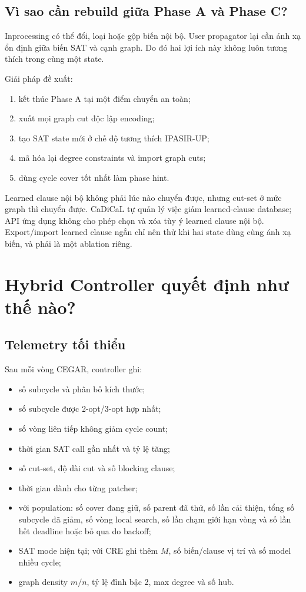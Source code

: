 \documentclass[11pt,a4paper,oneside]{scrreprt}
\begin{document}
\clearpage
\section{Vì sao cần rebuild giữa Phase A và Phase C?}

Inprocessing có thể đổi, loại hoặc gộp biến nội bộ. User propagator lại cần ánh xạ ổn định giữa biến SAT và cạnh graph. Do đó hai lợi ích này không luôn tương thích trong cùng một state.

Giải pháp đề xuất:

\begin{enumerate}
  \item kết thúc Phase A tại một điểm chuyển an toàn;
  \item xuất mọi graph cut độc lập encoding;
  \item tạo SAT state mới ở chế độ tương thích IPASIR-UP;
  \item mã hóa lại degree constraints và import graph cuts;
  \item dùng cycle cover tốt nhất làm phase hint.
\end{enumerate}

Learned clause nội bộ không phải lúc nào chuyển được, nhưng cut-set ở mức graph thì chuyển được. CaDiCaL tự quản lý việc giảm learned-clause database; API ứng dụng không cho phép chọn và xóa tùy ý learned clause nội bộ. Export/import learned clause ngắn chỉ nên thử khi hai state dùng cùng ánh xạ biến, và phải là một ablation riêng.

\chapter{Hybrid Controller quyết định như thế nào?}

\section{Telemetry tối thiểu}

Sau mỗi vòng CEGAR, controller ghi:

\begin{itemize}
  \item số subcycle và phân bố kích thước;
  \item số subcycle được 2-opt/3-opt hợp nhất;
  \item số vòng liên tiếp không giảm cycle count;
  \item thời gian SAT call gần nhất và tỷ lệ tăng;
  \item số cut-set, độ dài cut và số blocking clause;
  \item thời gian dành cho từng patcher;
  \item với population: số cover đang giữ, số parent đã thử, số lần cải thiện,
  tổng số subcycle đã giảm, số vòng local search, số lần chạm giới hạn vòng và
  số lần hết deadline hoặc bỏ qua do backoff;
  \item SAT mode hiện tại; với CRE ghi thêm $M$, số biến/clause vị trí và số model nhiều cycle;
  \item graph density $m/n$, tỷ lệ đỉnh bậc 2, max degree và số hub.
\end{itemize}
\end{document}
